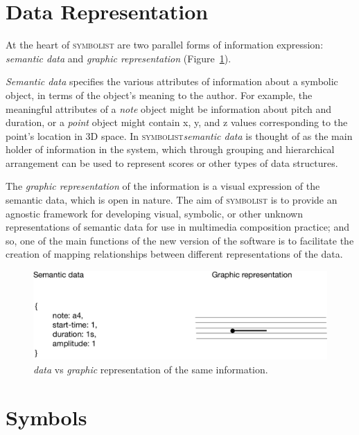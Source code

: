 \documentclass{article}
\def\symbolist{\textsc{symbolist}\xspace}
\begin{document}
\section{Data Representation}\label{sec:representation}

At the heart of \symbolist are two parallel forms of information expression: \textit{semantic data} and \textit{graphic representation} (Figure~\ref{fig:graphic-representation}).

\textit{Semantic data} specifies the various attributes of information about a symbolic object, in terms of the object's meaning to the author. 
For example, the meaningful attributes of a \textit{note} object might be information about pitch and duration, or a \textit{point} object might contain x, y, and z values corresponding to the point's location in 3D space. In \symbolist \textit{semantic data} is thought of as the main holder of information in the system, which through grouping and hierarchical arrangement can be used to represent scores or other types of data structures.

The \textit{graphic representation} of the information is a visual expression of the semantic data, which is open in nature. The aim of \symbolist is to provide an agnostic framework for developing visual, symbolic, or other unknown representations of semantic data for use in multimedia composition practice; and so, one of the main functions of the new version of the software is to facilitate the creation of mapping relationships between different representations of the data.


\begin{figure}[ht!]
\centering
\includegraphics[width=1\columnwidth]{graphic-representation.pdf}
\caption{\textit{data} vs \textit{graphic} representation of the same information.
\label{fig:graphic-representation}}
\end{figure}



\section{Symbols}\label{sec:symbols}
\end{document}
